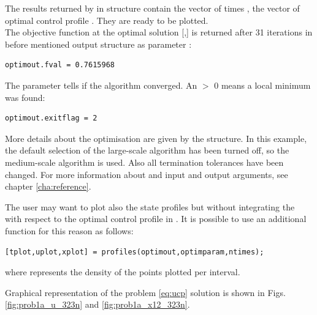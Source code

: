 The results returned by  in  structure
contain the vector of times , the vector of optimal control
profile . They are ready to be plotted.\\
The objective function at the optimal solution [,]
is returned after 31 iterations in before mentioned output structure
 as parameter :
\begin{verbatim}
optimout.fval = 0.7615968
\end{verbatim}
The parameter  tells if the algorithm converged. An
 $>$ 0 means a local minimum was found: 
\begin{verbatim}
optimout.exitflag = 2
\end{verbatim}
More details about the optimisation are given by the
 structure. In this example, the default
selection of the large-scale algorithm has been turned off, so the
medium-scale algorithm is used. Also all termination tolerances have
been changed. For more information about  and
 input and output arguments, see chapter
\ref{cha:reference}. 

The user may want to plot also the state profiles but without
integrating the  with respect to the optimal control
profile in . It is possible to use an additional
function  for this reason as follows:
\begin{verbatim}
[tplot,uplot,xplot] = profiles(optimout,optimparam,ntimes);
\end{verbatim}
where  represents the density of the points plotted per
interval.

Graphical representation of the problem \eqref{eq:ucp} solution is
shown in Figs. \ref{fig:prob1a_u_323n} and \ref{fig:prob1a_x12_323n}. 

